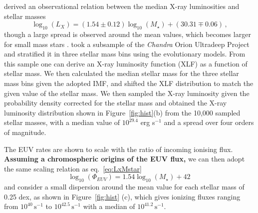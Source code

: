 \documentclass[fleqn,usenatbib]{mnras}
\begin{document}
\citet{Gudel2007} derived an observational relation between the median X-ray luminosities and stellar masses
\begin{equation} \label{eq:LxMstar}
    \log_{10}(L_{X}) = (1.54\pm0.12) \log_{10}(M_\star) + (30.31\mp0.06) \,,
\end{equation}
though a large spread is observed around the mean values, which becomes larger for small mass stars \citep[e.g.][]{Getman2022}.
\citet{Kuhn2019} took a subsample of the \textit{Chandra} Orion Ultradeep Project \citep[COUP, cf.][]{Getman2005} and stratified it in three stellar mass bins using the \citet{Baraffe1998} evolutionary models. From this sample one can derive an X-ray luminosity function (XLF) as a function of stellar mass.
We then calculated the median stellar mass for the three stellar mass bins 
given the adopted IMF, and shifted the XLF distribution to match the given value of the stellar mass. We then sampled the X-ray luminosity given the probability density corrected for the stellar mass and obtained the X-ray luminosity distribution shown in Figure~\ref{fig:hist}(b) from the 10,000 sampled stellar masses, with a median value of $10^{29.4}$ erg s$^{-1}$ and a spread over four orders of magnitude.

The EUV rates are shown to scale with the ratio of incoming ionising flux. {\bf Assuming a chromospheric origins of the EUV flux,} we can then adopt the same scaling relation as eq.~\ref{eq:LxMstar}
\begin{equation} \label{eq:PhiEUVMstar}
    \log_{10}(\Phi_{EUV}) = 1.54 \log_{10}(M_\star) + 42 \,
\end{equation}
and consider a small dispersion around the mean value for each stellar mass of 0.25 dex, as shown in Figure~\ref{fig:hist} (c), which gives ionizing fluxes ranging from $10^{40}\,\mathrm{s^{-1}}$ to $10^{42.5}\,\mathrm{s^{-1}}$ with a median of $10^{41.2}\,\mathrm{s^{-1}}$.
\end{document}
